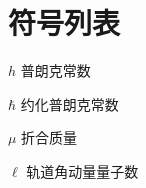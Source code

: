

\chapter{符号列表}


\begin{denotation}
    \item[$h$] 普朗克常数
    \item[$\hbar$] 约化普朗克常数
    \item[$\mu$] 折合质量
    \item[$ \ell $ ] 轨道角动量量子数
\end{denotation}






